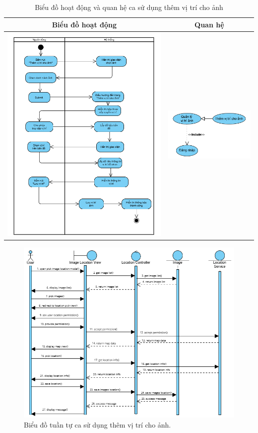 \noindent 
\begin{table}[H]
\centering
\caption{Biểu đồ hoạt động và quan hệ ca sử dụng thêm vị trí cho ảnh}
\label{tab:add-location-usecase-activity}
\begin{tabular}{| c | c |}
    \hline
    \textbf{Biểu đồ hoạt động} & \textbf{Quan hệ} \\ 
    \hline
    \includegraphics[width=0.6\linewidth]{figures/c3/3-3-15-activity-diagram.png} 
    &  
    \includegraphics[width=0.35\linewidth]{figures/c3/3-3-15-relationship.png} \\ 
    \hline
\end{tabular}
\end{table}

\begin{figure}[H]
    \centering  
    \includegraphics[width=1\textwidth]{figures/c3/3-3-15-sequence-diagram.png}
    \caption{Biểu đồ tuần tự ca sử dụng thêm vị trí cho ảnh.}
    \label{fig:3-3-15-sequence-diagram}
\end{figure}